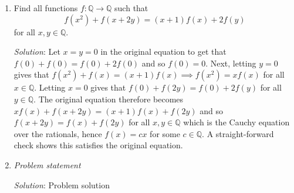 \documentclass{article}
\begin{document}
\begin{enumerate}[1.]
\item %
\newcommand{\QQ}{\mathbb{Q}}
Find all functions $f : \QQ \to \QQ$ such that
\[ f(x^2) +f(x+2y) = (x+1)f(x) +2f(y) \]
for all $x, y \in \QQ$. 

\textit{Solution}: 
Let $x=y=0$ in the original equation to get that $f(0)+f(0)=f(0)+2f(0)$ and so $f(0)=0$. Next, letting $y=0$ gives that $f(x^2)+f(x)=(x+1)f(x) \implies f(x^2)=xf(x)$ for all $x \in \QQ$. Letting $x=0$ gives that $f(0)+f(2y)=f(0)+2f(y)$ for all $y \in \QQ$. The original equation therefore becomes $xf(x)+f(x+2y)=(x+1)f(x)+f(2y)$ and so $f(x+2y)=f(x)+f(2y)$ for all $x,y \in \QQ$ which is the Cauchy equation over the rationals, hence $f(x)=cx$ for some $c\in\QQ$. A straight-forward check shows this satisfies the original equation.


\item %
\textit{Problem statement}

\textit{Solution}: Problem solution

\end{enumerate}
\end{document}
